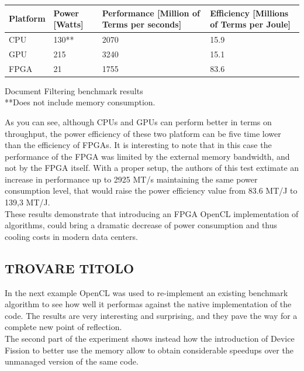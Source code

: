 \begin{tablehere}
{\footnotesize
\begin{tabular}{|p{}|p{}|p{}|p{}|}\hline
\textbf{Platform} & \textbf{Power} [Watts] & \textbf{Performance} [Million of Terms per seconds] & \textbf{Efficiency} [Millions of Terms per Joule]\\ \hline
CPU & 130** & 2070 & 15.9 \\ \hline
GPU & 215 & 3240 & 15.1 \\ \hline
FPGA & 21 & 1755 & 83.6 \\ \hline
\end{tabular}}
  \caption{Document Filtering benchmark results\\ **Does not include memory consumption.\\}
	\label{tab:FPGABenchmark2}
\end{tablehere}

As you can see, although CPUs and GPUs can perform better in terms on throughput, the power efficiency of these two platform can be five time lower than the efficiency of FPGAs. It is interesting to note that in this case the performance of the FPGA was limited by the external memory bandwidth, and not by the FPGA itself. With a proper setup, the authors of this test extimate an increase in performance up to 2925 MT/s maintaining the same power consumption level, that would raise the power efficiency value from 83.6 MT/J to 139,3 MT/J.\\
These results demonstrate that introducing an FPGA OpenCL implementation of algorithms, could bring a dramatic decrease of power consumption and thus cooling costs in modern data centers.



\subsection{TROVARE TITOLO}

In the next example \cite{Pennycook2012} OpenCL was used to re-implement an existing benchmark algorithm to see how well it performas against the native implementation of the code. The results are very interesting and surprising, and they pave the way for a complete new point of reflection.\\
The second part of the experiment shows instead how the introduction of Device Fission to better use the memory allow to obtain considerable speedups over the unmanaged version of the same code.

